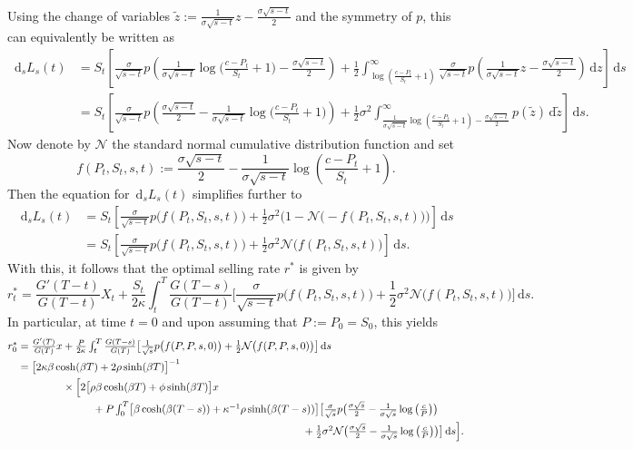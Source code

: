 \documentclass[openany,oneside]{article}
\theoremstyle{definition}
\theoremstyle{remark}
\newcommand{\ts}{\textstyle}
\newcommand{\de}{\,\mathrm{d}}
\begin{document}
{\color{blue}Using the change of variables $\tilde z := \frac{1}{\sigma\sqrt{s-t}}z-\frac{\sigma\sqrt{s-t}}{2}$ and the symmetry of $p$, this can equivalently be written as
\begin{align*}
 \ts \de_s L_s(t) &\ts= S_t\left[ \frac{\sigma}{\sqrt{s-t}}p\left(\frac{1}{\sigma\sqrt{s-t}}\log\bigl(\frac{c-P_t}{S_t}+1\bigr)-\frac{\sigma\sqrt{s-t}}{2} \right)+\frac{1}{2}\int_{\log\left(\frac{c-P_t}{S_t}+1\right)}^\infty \frac{\sigma}{\sqrt{s-t}}p\left(\frac{1}{\sigma\sqrt{s-t}}z-\frac{\sigma\sqrt{s-t}}{2}\right)\de z \right] \de s\\
  &\ts = S_t\left[ \frac{\sigma}{\sqrt{s-t}}p\left(\frac{\sigma\sqrt{s-t}}{2}-\frac{1}{\sigma\sqrt{s-t}}\log\bigl(\frac{c-P_t}{S_t}+1\bigr) \right)+\frac{1}{2}\sigma^2 \int_{\frac{1}{\sigma\sqrt{s-t}}\log\left(\frac{c-P_t}{S_t}+1\right) - \frac{\sigma\sqrt{s-t}}{2}}^\infty p(\tilde z)\de\tilde z \right] \de s.
\end{align*}
Now denote by $\mathcal N$ the standard normal cumulative distribution function and set
\[
 \ts f(P_t,S_t,s,t) := \frac{\sigma\sqrt{s-t}}{2} - \frac{1}{\sigma\sqrt{s-t}}\log\left(\frac{c-P_t}{S_t}+1\right).
\]
Then the equation for $\de_s L_s(t)$ simplifies further to
\begin{align*}
 \ts \de_s L_s(t) &\ts= S_t\left[ \frac{\sigma}{\sqrt{s-t}}p\bigl(f(P_t,S_t,s,t)\bigr)+\frac{1}{2}\sigma^2 \bigl(1 - \mathcal N\bigl(-f(P_t,S_t,s,t)\bigr)\bigr)\right] \de s\\
  &\ts= S_t\left[ \frac{\sigma}{\sqrt{s-t}}p\bigl(f(P_t,S_t,s,t)\bigr)+\frac{1}{2}\sigma^2 \mathcal N\bigl(f(P_t,S_t,s,t)\bigr)\right] \de s.
\end{align*}
With this, it follows that the optimal selling rate $r^*$ is given by
\[
 \ts r_t^* = \frac{G'(T-t)}{G(T-t)} X_t + \frac{S_t}{2\kappa}\int_t^T  \frac{G(T-s)}{G(T-t)} \bigl[ \frac{\sigma}{\sqrt{s-t}}p\bigl(f(P_t,S_t,s,t)\bigr)+\frac{1}{2}\sigma^2 \mathcal N\bigl(f(P_t,S_t,s,t)\bigr)\bigr] \de s.
\]
In particular, at time $t=0$ and upon assuming that $P:=P_0=S_0$, this yields
\begin{align*}
 \ts r_0^* &\ts= \frac{G'(T)}{G(T)} x + \frac{P}{2\kappa}\int_t^T  \frac{G(T-s)}{G(T)} \bigl[ \frac{1}{\sqrt{s}}p\bigl(f(P,P,s,0)\bigr)+\frac{1}{2}\mathcal N\bigl(f(P,P,s,0)\bigr)\bigr] \de s\\
           &\ts= \bigl[2\kappa\beta\cosh(\beta T)+2\rho\sinh(\beta T)\bigr]^{-1}\\
					 &\ts\hspace{1.5cm}\times\Bigl[ 2\bigl[\rho\beta\cosh(\beta T)+\phi\sinh(\beta T)\bigr] x\\
					 &\ts\hspace{2.5cm}+ P\int_0^T  \bigl[\beta\cosh(\beta (T-s))+\kappa^{-1}\rho\sinh(\beta (T-s))\bigr] \bigl[ \frac{\sigma}{\sqrt{s}}p\bigl(\frac{\sigma\sqrt{s}}{2} - \frac{1}{\sigma\sqrt{s}}\log\left(\frac{c}{P}\right)\bigr)\\
					 &\ts\hspace{9.5cm}+\frac{1}{2}\sigma^2 \mathcal N\bigl(\frac{\sigma\sqrt{s}}{2} - \frac{1}{\sigma\sqrt{s}}\log\left(\frac{c}{P}\right)\bigr)\bigr] \de s\Bigr].
\end{align*}
}
\end{document}
